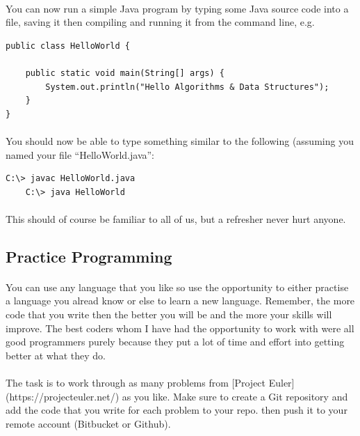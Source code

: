 \documentclass[10pt, a4paper, twosize]{article}
\begin{document}
\paragraph{} You can now run a simple Java program by typing some Java source code into a file, saving it then compiling and running it from the command line, e.g.

\begin{lstlisting}
public class HelloWorld {

	public static void main(String[] args) {
		System.out.println("Hello Algorithms & Data Structures");
	}
}
\end{lstlisting}

\paragraph{} You should now be able to type something similar to the following (assuming you named your file ``HelloWorld.java'':

\begin{lstlisting}[style=DOS]
    C:\> javac HelloWorld.java
    C:\> java HelloWorld
\end{lstlisting}

\paragraph{} This should of course be familiar to all of us, but a refresher never hurt anyone.

\subsection{Practice Programming}

\paragraph{} You can use any language that you like so use the opportunity to either practise a language you alread know or else to learn a new language. Remember, the more code that you write then the better you will be and the more your skills will improve. The best coders whom I have had the opportunity to work with were all good programmers purely because they put a lot of time and effort into getting better at what they do. 

\paragraph{} The task is to work through as many problems from [Project Euler](https://projecteuler.net/) as you like. Make sure to create a Git repository and add the code that you write for each problem to your repo. then push it to your remote account (Bitbucket or Github).
\end{document}
